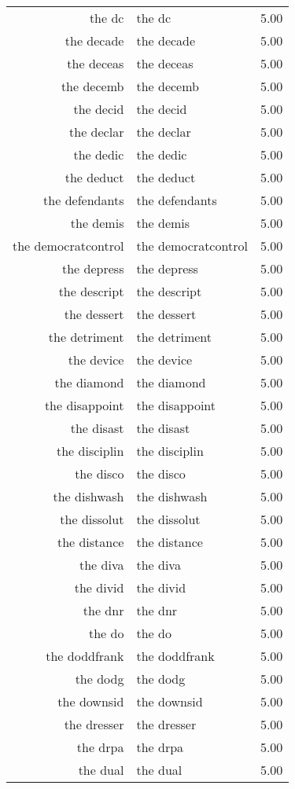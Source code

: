 \begin{table}[ht]
\begin{tabular}{rlr}
  the dc & the dc & 5.00 \\ 
  the decade & the decade & 5.00 \\ 
  the deceas & the deceas & 5.00 \\ 
  the decemb & the decemb & 5.00 \\ 
  the decid & the decid & 5.00 \\ 
  the declar & the declar & 5.00 \\ 
  the dedic & the dedic & 5.00 \\ 
  the deduct & the deduct & 5.00 \\ 
  the defendants & the defendants & 5.00 \\ 
  the demis & the demis & 5.00 \\ 
  the democratcontrol & the democratcontrol & 5.00 \\ 
  the depress & the depress & 5.00 \\ 
  the descript & the descript & 5.00 \\ 
  the dessert & the dessert & 5.00 \\ 
  the detriment & the detriment & 5.00 \\ 
  the device & the device & 5.00 \\ 
  the diamond & the diamond & 5.00 \\ 
  the disappoint & the disappoint & 5.00 \\ 
  the disast & the disast & 5.00 \\ 
  the disciplin & the disciplin & 5.00 \\ 
  the disco & the disco & 5.00 \\ 
  the dishwash & the dishwash & 5.00 \\ 
  the dissolut & the dissolut & 5.00 \\ 
  the distance & the distance & 5.00 \\ 
  the diva & the diva & 5.00 \\ 
  the divid & the divid & 5.00 \\ 
  the dnr & the dnr & 5.00 \\ 
  the do & the do & 5.00 \\ 
  the doddfrank & the doddfrank & 5.00 \\ 
  the dodg & the dodg & 5.00 \\ 
  the downsid & the downsid & 5.00 \\ 
  the dresser & the dresser & 5.00 \\ 
  the drpa & the drpa & 5.00 \\ 
  the dual & the dual & 5.00 \\ 

\end{tabular}
\end{table}
